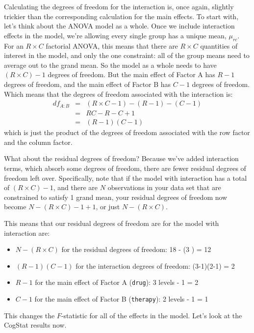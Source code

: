 \documentclass[
]{book}
\providecommand{\tightlist}{%
  \setlength{\itemsep}{0pt}\setlength{\parskip}{0pt}}
\theoremstyle{definition}
\theoremstyle{definition}
\theoremstyle{definition}
\theoremstyle{definition}
\theoremstyle{remark}
\begin{document}
Calculating the degrees of freedom for the interaction is, once again, slightly trickier than the corresponding calculation for the main effects. To start with, let's think about the ANOVA model as a whole. Once we include interaction effects in the model, we're allowing every single group has a unique mean, \(\mu_{rc}\). For an \(R \times C\) factorial ANOVA, this means that there are \(R \times C\) quantities of interest in the model, and only the one constraint: all of the group means need to average out to the grand mean. So the model as a whole needs to have \((R\times C) - 1\) degrees of freedom. But the main effect of Factor A has \(R-1\) degrees of freedom, and the main effect of Factor B has \(C-1\) degrees of freedom. Which means that the degrees of freedom associated with the interaction is:
\[
\begin{array}{rcl}
{df}_{A:B} &=& (R\times C - 1) - (R - 1) - (C -1 ) \\
&=& RC - R - C + 1 \\
&=& (R-1)(C-1)
\end{array}
\]
which is just the product of the degrees of freedom associated with the row factor and the column factor.

What about the residual degrees of freedom? Because we've added interaction terms, which absorb some degrees of freedom, there are fewer residual degrees of freedom left over. Specifically, note that if the model with interaction has a total of \((R \times C) - 1\), and there are \(N\) observations in your data set that are constrained to satisfy 1 grand mean, your residual degrees of freedom now become \(N-(R \times C)-1+1\), or just \(N-(R \times C)\).

This means that our residual degrees of freedom are for the model with interaction are:

\begin{itemize}
\tightlist
\item
  \(N-(R \times C)\) for the residual degrees of freedom: 18 - (3 ) = 12
\item
  \((R-1)(C-1)\) for the interaction degrees of freedom: (3-1)(2-1) = 2
\item
  \(R-1\) for the main effect of Factor A (\texttt{drug}): 3 levels - 1 = 2
\item
  \(C-1\) for the main effect of Factor B (\texttt{therapy}): 2 levels - 1 = 1
\end{itemize}

This changes the \(F\)-statistic for all of the effects in the model. Let's look at the CogStat results now.
\end{document}
